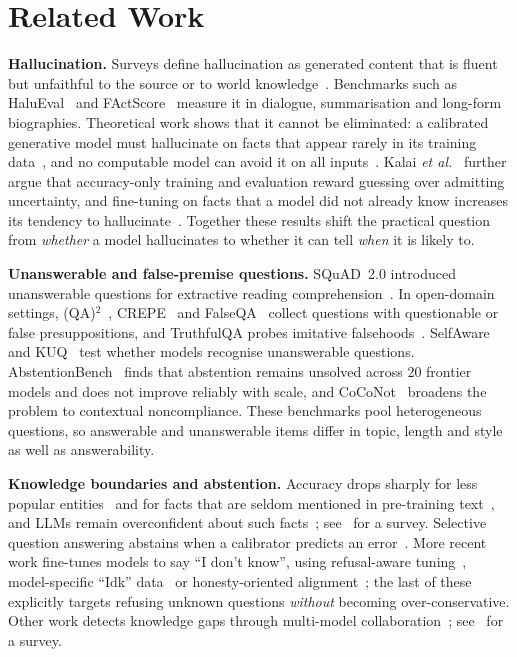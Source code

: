 \section{Related Work}
\label{sec:related}

\textbf{Hallucination.} Surveys define hallucination as generated content that is fluent but unfaithful to the source or to world knowledge~\cite{ji2023survey,huang2025survey}. Benchmarks such as HaluEval~\cite{li2023halueval} and FActScore~\cite{min2023factscore} measure it in dialogue, summarisation and long-form biographies. Theoretical work shows that it cannot be eliminated: a calibrated generative model must hallucinate on facts that appear rarely in its training data~\cite{kalai2024calibrated}, and no computable model can avoid it on all inputs~\cite{xu2024inevitable}. Kalai \emph{et al.}~\cite{kalai2025why} further argue that accuracy-only training and evaluation reward guessing over admitting uncertainty, and fine-tuning on facts that a model did not already know increases its tendency to hallucinate~\cite{gekhman2024finetuning}. Together these results shift the practical question from \emph{whether} a model hallucinates to whether it can tell \emph{when} it is likely to.

\textbf{Unanswerable and false-premise questions.} SQuAD~2.0 introduced unanswerable questions for extractive reading comprehension~\cite{rajpurkar2018squad2}. In open-domain settings, (QA)$^2$~\cite{kim2023qa2}, CREPE~\cite{yu2023crepe} and FalseQA~\cite{hu2023falseqa} collect questions with questionable or false presuppositions, and TruthfulQA probes imitative falsehoods~\cite{lin2022truthfulqa}. SelfAware~\cite{yin2023selfaware} and KUQ~\cite{amayuelas2024kuq} test whether models recognise unanswerable questions. AbstentionBench~\cite{kirichenko2025abstentionbench} finds that abstention remains unsolved across 20 frontier models and does not improve reliably with scale, and CoCoNot~\cite{brahman2024noncompliance} broadens the problem to contextual noncompliance. These benchmarks pool heterogeneous questions, so answerable and unanswerable items differ in topic, length and style as well as answerability.

\textbf{Knowledge boundaries and abstention.} Accuracy drops sharply for less popular entities~\cite{mallen2023popqa} and for facts that are seldom mentioned in pre-training text~\cite{kandpal2023longtail}, and LLMs remain overconfident about such facts~\cite{ren2025boundary}; see~\cite{li2025boundary} for a survey. Selective question answering abstains when a calibrator predicts an error~\cite{kamath2020selective}. More recent work fine-tunes models to say ``I don't know'', using refusal-aware tuning~\cite{zhang2024rtuning}, model-specific ``Idk'' data~\cite{cheng2024idk} or honesty-oriented alignment~\cite{yang2024honesty}; the last of these explicitly targets refusing unknown questions \emph{without} becoming over-conservative. Other work detects knowledge gaps through multi-model collaboration~\cite{feng2024abstain}; see~\cite{wen2025abstention} for a survey.

